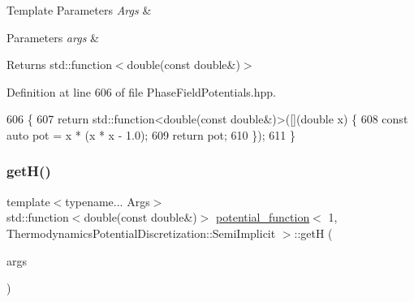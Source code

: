 \begin{DoxyTemplParams}{Template Parameters}
{\em Args} & \\
\hline
\end{DoxyTemplParams}

\begin{DoxyParams}{Parameters}
{\em args} & \\
\hline
\end{DoxyParams}
\begin{DoxyReturn}{Returns}
std\+::function$<$double(const double\&)$>$ 
\end{DoxyReturn}


Definition at line 606 of file Phase\+Field\+Potentials.\+hpp.


\begin{DoxyCode}
606                                                         \{
607     \textcolor{keywordflow}{return} std::function<double(const double&)>([](\textcolor{keywordtype}{double} x) \{
608       \textcolor{keyword}{const} \textcolor{keyword}{auto} pot = x * (x * x - 1.0);
609       \textcolor{keywordflow}{return} pot;
610     \});
611   \}
\end{DoxyCode}
\mbox{\label{structpotential__function_3_011_00_01ThermodynamicsPotentialDiscretization_1_1SemiImplicit_01_4_a82e4c4bf76347666f6e4f394581ee2b3}} 
\subsubsection{\texorpdfstring{get\+H()}{getH()}}
{\footnotesize\ttfamily template$<$typename... Args$>$ \\
std\+::function$<$double(const double\&)$>$ \hyperlink{structpotential__function}{potential\+\_\+function}$<$ 1, Thermodynamics\+Potential\+Discretization\+::\+Semi\+Implicit $>$\+::getH (\begin{DoxyParamCaption}\item[{Args...}]{args }\end{DoxyParamCaption})\hspace{0.3cm}{\ttfamily [inline]}}



